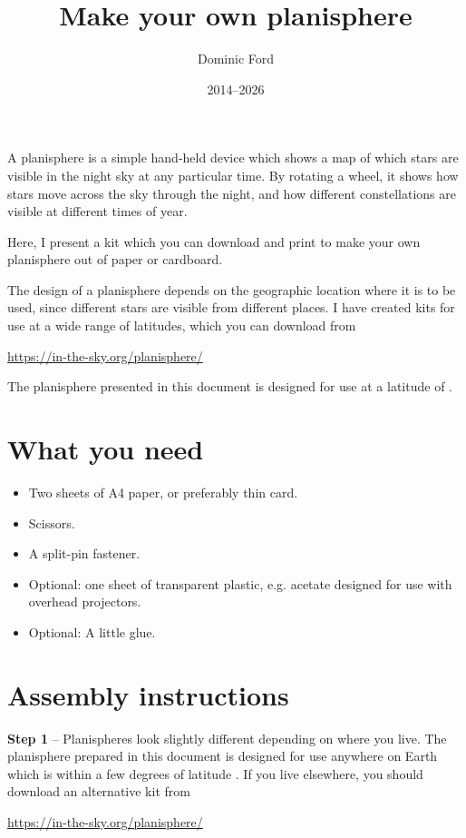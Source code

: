 \documentclass[a4paper,onecolumn,10pt]{article}
\title{Make your own planisphere}
\author{Dominic Ford}
\date{2014--2026}
\begin{document}
\maketitle
\setcounter{footnote}{1}

A planisphere is a simple hand-held device which shows a map of which stars are
visible in the night sky at any particular time. By rotating a wheel, it shows
how stars move across the sky through the night, and how different
constellations are visible at different times of year.

Here, I present a kit which you can download and print to make your own
planisphere out of paper or cardboard.

The design of a planisphere depends on the geographic location where it is to
be used, since different stars are visible from different places. I have
created kits for use at a wide range of latitudes, which you can download from

\url{https://in-the-sky.org/planisphere/}

The planisphere presented in this document is designed for use at a latitude of
.
 
\section*{What you need}

\begin{itemize}
\item Two sheets of A4 paper, or preferably thin card.
\item Scissors.
\item A split-pin fastener.
\item Optional: one sheet of transparent plastic, e.g. acetate designed for use with overhead projectors.
\item Optional: A little glue.
\end{itemize}

\section*{Assembly instructions}

{\bf Step 1} -- Planispheres look slightly different depending on where you
live. The planisphere prepared in this document is designed for use anywhere on
Earth which is within a few degrees of latitude . If you live
elsewhere, you should download an alternative kit from

\url{https://in-the-sky.org/planisphere/}
\end{document}
